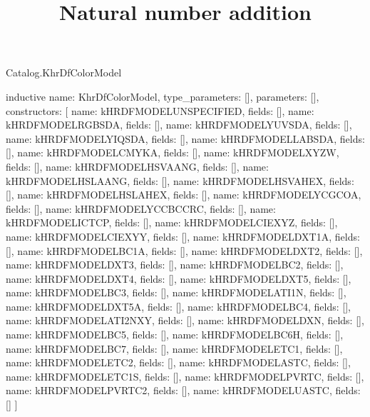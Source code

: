 \begin{lexlean}{Catalog.KhrDfColorModel}
\title{Natural number addition}
\begin{semanticmodule}
inductive{
  name: KhrDfColorModel,
  type_parameters: [],
  parameters: [],
  constructors: [
    {name: kHRDFMODELUNSPECIFIED, fields: []},
    {name: kHRDFMODELRGBSDA, fields: []},
    {name: kHRDFMODELYUVSDA, fields: []},
    {name: kHRDFMODELYIQSDA, fields: []},
    {name: kHRDFMODELLABSDA, fields: []},
    {name: kHRDFMODELCMYKA, fields: []},
    {name: kHRDFMODELXYZW, fields: []},
    {name: kHRDFMODELHSVAANG, fields: []},
    {name: kHRDFMODELHSLAANG, fields: []},
    {name: kHRDFMODELHSVAHEX, fields: []},
    {name: kHRDFMODELHSLAHEX, fields: []},
    {name: kHRDFMODELYCGCOA, fields: []},
    {name: kHRDFMODELYCCBCCRC, fields: []},
    {name: kHRDFMODELICTCP, fields: []},
    {name: kHRDFMODELCIEXYZ, fields: []},
    {name: kHRDFMODELCIEXYY, fields: []},
    {name: kHRDFMODELDXT1A, fields: []},
    {name: kHRDFMODELBC1A, fields: []},
    {name: kHRDFMODELDXT2, fields: []},
    {name: kHRDFMODELDXT3, fields: []},
    {name: kHRDFMODELBC2, fields: []},
    {name: kHRDFMODELDXT4, fields: []},
    {name: kHRDFMODELDXT5, fields: []},
    {name: kHRDFMODELBC3, fields: []},
    {name: kHRDFMODELATI1N, fields: []},
    {name: kHRDFMODELDXT5A, fields: []},
    {name: kHRDFMODELBC4, fields: []},
    {name: kHRDFMODELATI2NXY, fields: []},
    {name: kHRDFMODELDXN, fields: []},
    {name: kHRDFMODELBC5, fields: []},
    {name: kHRDFMODELBC6H, fields: []},
    {name: kHRDFMODELBC7, fields: []},
    {name: kHRDFMODELETC1, fields: []},
    {name: kHRDFMODELETC2, fields: []},
    {name: kHRDFMODELASTC, fields: []},
    {name: kHRDFMODELETC1S, fields: []},
    {name: kHRDFMODELPVRTC, fields: []},
    {name: kHRDFMODELPVRTC2, fields: []},
    {name: kHRDFMODELUASTC, fields: []}
  ]
}
\end{semanticmodule}
\end{lexlean}

